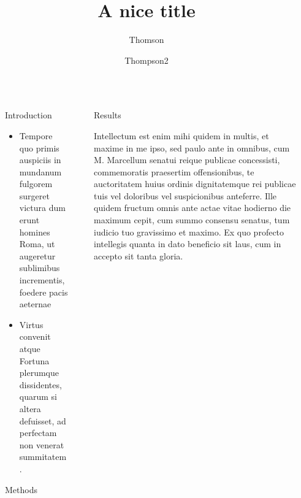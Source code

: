 \documentclass[final]{beamer}
\title{A nice title}
\author{Thomson\inst{1} \and Thompson{2}}
\institute[shortinst]{\inst{1} Some Institute \samelineand \inst{2} Another Institute}
\newlength{\sepwidth}
\newlength{\colwidth}
\newcommand{\separatorcolumn}{\begin{column}{\sepwidth}\end{column}}
\begin{document}
\begin{frame}[t]
\begin{columns}[t]
\separatorcolumn

\begin{column}{\colwidth}

\begin{block}{Introduction}

\begin{itemize}
    \item Tempore quo primis auspiciis in mundanum fulgorem surgeret victura dum erunt homines Roma, ut augeretur sublimibus incrementis, foedere pacis aeternae
	\item Virtus convenit atque Fortuna plerumque dissidentes, quarum si altera defuisset, ad perfectam non venerat summitatem.
\end{itemize}

\end{block}
  

\begin{block}{Methods}



\end{block}

\end{column}

\separatorcolumn

\begin{column}{\colwidth}

\begin{block}{Results}

Intellectum est enim mihi quidem in multis, et maxime in me ipso, sed paulo ante in omnibus, cum M. Marcellum senatui reique publicae concessisti, commemoratis praesertim offensionibus, te auctoritatem huius ordinis dignitatemque rei publicae tuis vel doloribus vel suspicionibus anteferre.
Ille quidem fructum omnis ante actae vitae hodierno die maximum cepit, cum summo consensu senatus, tum iudicio tuo gravissimo et maximo.
Ex quo profecto intellegis quanta in dato beneficio sit laus, cum in accepto sit tanta gloria.


\end{block}
\end{column}
\end{columns}
\end{frame}
\end{document}
